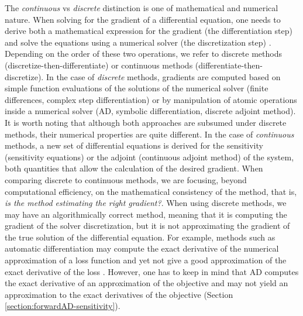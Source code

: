 The \textit{continuous} vs \textit{discrete} distinction is one of mathematical and numerical nature. 
When solving for the gradient of a differential equation, one needs to derive both a mathematical expression for the gradient (the differentiation step) and solve the equations using a numerical solver (the discretization step) \cite{bradley2013pde, Onken_Ruthotto_2020, FATODE2014, Sirkes_Tziperman_1997}. 
Depending on the order of these two operations, we refer to discrete methods (discretize-then-differentiate) or continuous methods (differentiate-then-discretize). 
In the case of \textit{discrete} methods, gradients are computed based on simple function evaluations of the solutions of the numerical solver (finite differences, complex step differentiation) or by manipulation of atomic operations inside a numerical solver (AD, symbolic differentiation, discrete adjoint method). 
It is worth noting that although both approaches are subsumed under discrete methods, their numerical properties are quite different.
In the case of \textit{continuous} methods, a new set of differential equations is derived for the sensitivity (sensitivity equations) or the adjoint (continuous adjoint method) of the system, both quantities that allow the calculation of the desired gradient.   
When comparing discrete to continuous methods, we are focusing, beyond computational efficiency, on the mathematical consistency of the method, that is, \textit{is the method estimating the right gradient?}. 
When using discrete methods, we may have an algorithmically correct method, meaning that it is computing the gradient of the solver discretization, but it is not approximating the gradient of the true solution of the differential equation. 
For example, methods such as automatic differentiation may compute the exact derivative of the numerical approximation of a loss function and yet not give a good approximation of the exact derivative of the loss \cite{Walther_2007}.
However, one has to keep in mind that AD computes the exact derivative of an approximation of the objective and may not yield an approximation to the exact derivatives of the objective (Section \ref{section:forwardAD-sensitivity}).

